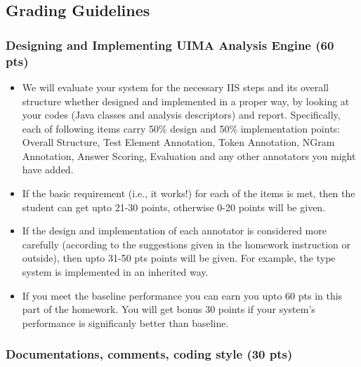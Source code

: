 
\subsection{Grading Guidelines}

\subsubsection{Designing and Implementing UIMA Analysis Engine (60 pts)}

\begin{itemize}

\item We will evaluate your system for the necessary IIS steps and its overall structure whether designed and implemented in a proper way, by looking at your
codes (Java classes and analysis descriptors) and report. 
Specifically, each of following items carry 50\% design and 50\% implementation points: 
Overall Structure, Test Element Annotation, Token Annotation, NGram Annotation, Answer Scoring, Evaluation and any other annotators you might have added.

\item If the basic requirement (i.e., it works!) for each of the items is met,
then the student can get upto 21-30 points, otherwise 0-20 points will be given.

\item If the design and implementation of each annotator is considered more carefully (according to the suggestions given in the homework instruction or outside), then upto 31-50 pts points will be given. For example, the type system is implemented in an inherited way.

\item If you meet the baseline performance you can earn you upto 60 pts in this part of the homework.  You will get bonus 30 points if your system's performance is significanly better than baseline.

\end{itemize}

\subsubsection{Documentations, comments, coding style (30 pts)}

